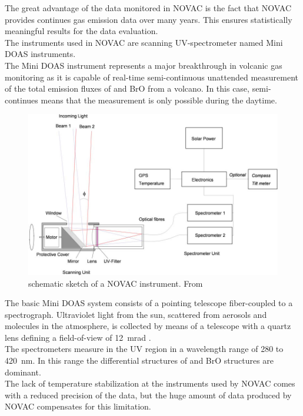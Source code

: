 The great advantage of the data monitored in NOVAC is the fact that NOVAC provides continues gas emission data over many years. This ensures statistically meaningful results for the data evaluation.\\
The instruments used in NOVAC are scanning UV-spectrometer named Mini DOAS instruments. \\
The  Mini DOAS instrument represents a major breakthrough in volcanic gas monitoring as it is capable of real-time semi-continuous unattended measurement of the total emission fluxes of   and BrO from a volcano. In this case, semi-continues means that the measurement is only possible during the daytime.\\
%
\begin{figure}
	\centering
	\includegraphics[width=1\textwidth]{Bilder/Simon/Bilder_Tung/NOVAC_Instrument}
	\caption{schematic sketch of a NOVAC instrument. From \cite{galle2010network}}
\end{figure}
The  basic  Mini DOAS  system  consists  of  a  pointing  telescope  fiber-coupled  to  a  spectrograph.  
Ultraviolet light from the sun, scattered from aerosols and molecules in the atmosphere, is collected by 
means  of  a  telescope  with  a  quartz  lens  defining  a  field-of-view  of  12~mrad
\citep{NOVACsite}. \\
The spectrometers measure in the UV region in a wavelength range of 280 to 420~nm. In this range the differential structures of  and BrO structures are dominant.\\
The lack of temperature stabilization at the instruments used by NOVAC comes with a reduced precision of the data, but the huge amount of data produced by NOVAC compensates for this limitation.  


